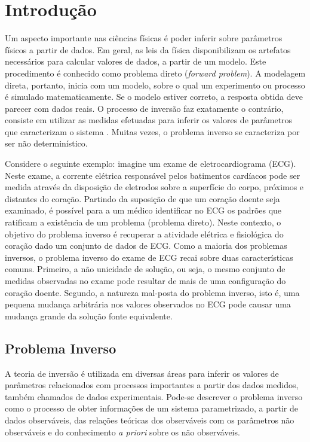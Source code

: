 \chapter{Introdução}
\label{cap:1intro}

Um aspecto importante nas ciências físicas é poder inferir sobre parâmetros
físicos a partir de dados. Em geral, as leis da física disponibilizam os
artefatos necessários para calcular valores de dados, a partir de um modelo.
Este procedimento é conhecido como problema direto (\textit{forward problem}).
A modelagem direta, portanto, inicia com um modelo, sobre o qual um experimento ou processo
é simulado matematicamente. Se o modelo estiver correto, a resposta
obtida deve parecer com dados reais. O processo de inversão faz exatamente o contrário,
consiste em utilizar as medidas efetuadas para inferir os valores de parâmetros que
caracterizam o sistema \citep{tarantola}. Muitas vezes, o problema inverso se caracteriza
por ser não determinístico.

Considere o seguinte exemplo: imagine um exame de eletrocardiograma (ECG). Neste exame,
a corrente elétrica responsável pelos batimentos cardíacos
pode ser medida  através da disposição de eletrodos sobre a superfície do corpo,
próximos e distantes do coração. Partindo da suposição de que um coração doente
seja examinado, é possível para a um médico identificar no ECG os padrões que ratificam
a existência de um problema (problema direto). Neste contexto, o objetivo do problema inverso
é recuperar a atividade elétrica e fisiológica do coração dado um conjunto de dados de ECG.
Como a maioria dos problemas inversos, o problema inverso do exame de ECG recai sobre duas características
comuns. Primeiro, a não unicidade de solução, ou seja, o mesmo conjunto de medidas
observadas no exame pode resultar de mais de uma configuração do coração doente. Segundo,
a natureza mal-posta do problema inverso, isto é, uma pequena mudança arbitrária nos
valores observados no ECG pode causar uma mudança grande da solução fonte equivalente.

\section{Problema Inverso}

A teoria de inversão é utilizada em diversas áreas para inferir os valores de
parâmetros relacionados com processos importantes a partir dos dados medidos,
também chamados de dados experimentais. Pode-se descrever o problema inverso
como o processo de obter informações de um sistema parametrizado, a partir de
dados observáveis, das relações teóricas dos observáveis com os parâmetros não
observáveis e do conhecimento \textit{a priori} sobre os não observáveis.

